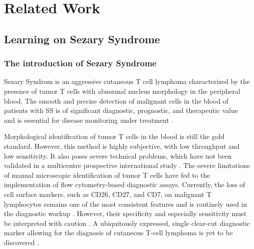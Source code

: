 \chapter{Related Work}

\section{Learning on Sezary Syndrome}
\subsection{ The introduction of Sezary Syndrome } %
Sezary Syndrom is an aggressive cutaneous T cell lymphoma characterized by the presence of tumor T cells with abnormal nucleus morphology in the peripheral blood. The smooth and precise detection of malignant cells in the blood of patients with SS is of significant diagnostic, prognostic, and therapeutic value and is essential for disease monitoring under treatment \cite{6}\cite{7}\cite{weng}.

Morphological identification of tumor T cells in the blood is still the gold standard. However, this method is highly subjective, with low throughput and low sensitivity. It also poses severe technical problems, which have not been validated in a multicentre prospective international study \cite{15}. The severe limitations of manual microscopic identification of tumor T cells have fed to the implementation of flow cytometry-based diagnostic assays. Currently, the loss of cell surface markers, such as CD26, CD27, and CD7, on malignant T lymphocytes remains one of the most consistent features and is routinely used in the diagnostic workup \cite{12}. However, their specificity and especially sensitivity must be interpreted with caution \cite{nagler}. A ubiquitously expressed, single clear-cut diagnostic marker allowing for the diagnosis of cutaneous T-cell lymphoma is yet to be discovered \cite{desimone}.


